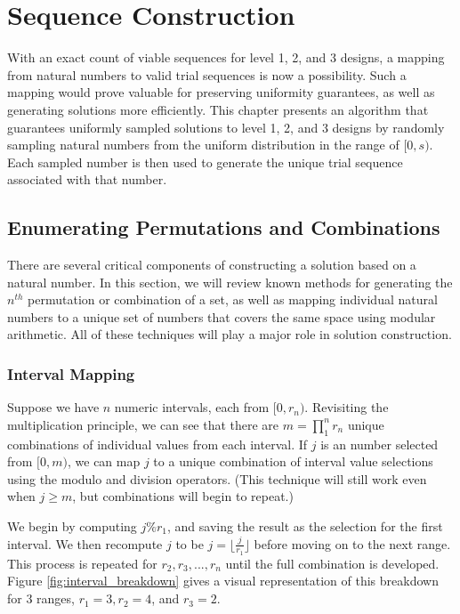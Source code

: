 
\chapter{Sequence Construction}

With an exact count of viable sequences for level 1, 2, and 3 designs, a mapping from natural numbers to valid trial sequences is now a possibility. Such a mapping would prove valuable for preserving uniformity guarantees, as well as generating solutions more efficiently. This chapter presents an algorithm that guarantees uniformly sampled solutions to level 1, 2, and 3 designs by randomly sampling natural numbers from the uniform distribution in the range of $[0, s)$. Each sampled number is then used to generate the unique trial sequence associated with that number.


\section{Enumerating Permutations and Combinations}

There are several critical components of constructing a solution based on a natural number. In this section, we will review known methods for generating the $n^{th}$ permutation or combination of a set, as well as mapping individual natural numbers to a unique set of numbers that covers the same space using modular arithmetic. All of these techniques will play a major role in solution construction.

\subsection{Interval Mapping}

Suppose we have $n$ numeric intervals, each from $[0, r_n)$. Revisiting the multiplication principle, we can see that there are $m = \prod_1^n r_n$ unique combinations of individual values from each interval. If $j$ is an number selected from $[0, m)$, we can map $j$ to a unique combination of interval value selections using the modulo and division operators. (This technique will still work even when $j \geq m$, but combinations will begin to repeat.)

We begin by computing $j \% r_1$, and saving the result as the selection for the first interval. We then recompute $j$ to be $j = \lfloor \frac{j}{r_1} \rfloor$ before moving on to the next range. This process is repeated for $r_2,r_3,...,r_n$ until the full combination is developed. Figure \ref{fig:interval_breakdown} gives a visual representation of this breakdown for 3 ranges, $r_1 = 3, r_2 = 4$, and $r_3 = 2$.

